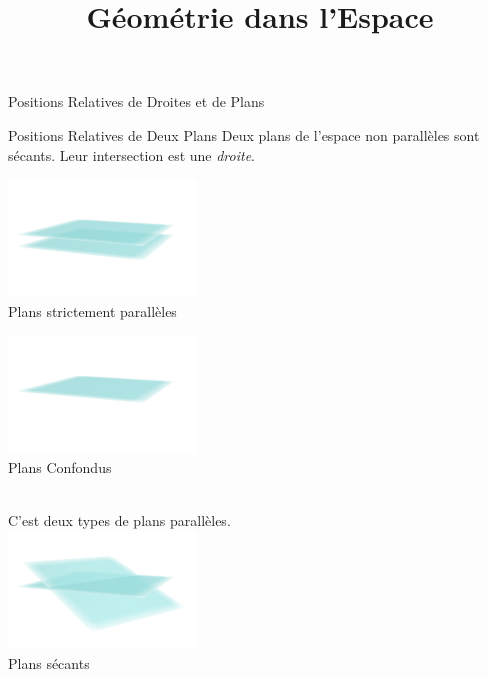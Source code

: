 \documentclass{cours}
\title{Géométrie dans l'Espace}
\begin{document}

    \begin{Gpartie}{Positions Relatives de Droites et de Plans} 
        \begin{Spartie}{Positions Relatives de Deux Plans} 
            Deux plans de l'espace non parallèles sont sécants. Leur intersection est une \emph{droite}.
            \begin{center}
                    \begin{minipage}{5cm}\includegraphics[width=5cm]{rsc/11fig1a.png}\\ \centering Plans strictement parallèles\end{minipage}
                    \begin{minipage}{5cm}\includegraphics[width=5cm]{rsc/11fig1b.png}\\ \centering Plans Confondus\phantom{p}\end{minipage} \\[2ex] %
                    C'est deux types de plans parallèles. \\
                    \includegraphics[width=5cm]{rsc/11fig1c.png} \\
                    Plans sécants
                \parbox{\linewidth}{}

\end{center}
\end{Spartie}
\end{Gpartie}
\end{document}
